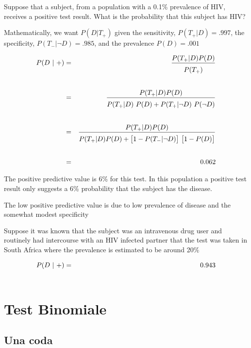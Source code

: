 \documentclass[10pt,openany]{book}
\theoremstyle{mio}
\theoremstyle{liscio}
\begin{document}
Suppose that a subject, from a population with a {\color{brown} 0.1\% prevalence}
of HIV, receives a positive test result. What is the probability
that this subject has HIV?

Mathematically, we want $P(D | T_+)$ given the sensitivity, {\color{brown}$P(T_+
| D) = .997$}, the specificity, {\color{brown}$P(T_- | \neg D) =.985$}, and the
prevalence {\color{brown}$P(D) = .001$}

\begin{eqnarray*}
P(D ~|~ +)& = &\frac{P(T_+|D)P(D)}{P(T_+)\vphantom{\Big[}}\\ \\
& = &\frac{P(T_+|D)P(D)}{P(T_+|D)\ P(D) + P(T_+|\neg D)\ P(\neg D)\vphantom{\Big[}}\\ \\
& = & \frac{P(T_+|D)P(D)}{P(T_+|D)P(D) + \big[1-P(T_-|\neg D)\big]\ \big[1 - P(D)\big]\vphantom{\Big[}} \\ \\
& = & 0.062
\end{eqnarray*}

The {\color{brown}positive predictive value is 6\%} for this test. In this population a positive test result only suggests a 6\% probability that the subject has the disease. 


The low positive predictive value is due to low prevalence of disease and the
somewhat modest specificity 

Suppose it was known that the subject was an intravenous drug user and routinely had intercourse with an HIV infected partner that the test was taken in South Africa where the prevalence is estimated to be around 20\%

\begin{eqnarray*}
P(D ~|~ +)& = & 0.943\\
& \hphantom{=} & \hphantom{\frac{P(T_+|D)P(D)}{P(T_+|D)P(D) + \big[1-P(T_-|\neg D)\big]\ \big[1 - P(D)\big]\vphantom{\Big[}}}
\end{eqnarray*}


\clearpage\section{Test Binomiale}
\subsection{Una coda}\label{Bernoulli_test}
\end{document}

